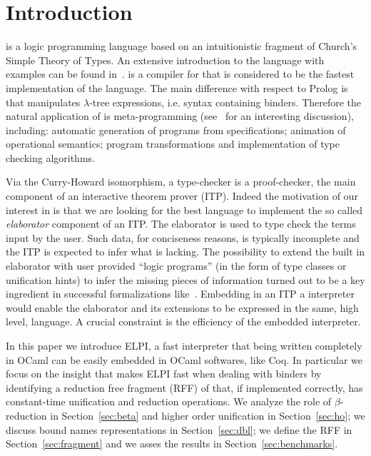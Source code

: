 \documentclass{llncs}
\begin{document}
\section{Introduction}%
\lp{} is a logic programming language based on an intuitionistic fragment of
Church's Simple Theory of Types. An extensive introduction to the language
with examples can be found in~\cite{Miller:2012:PHL:2331097}. \tedius{}
\cite{DBLP:conf/cade/NadathurM99,DBLP:journals/corr/abs-0911-5203} is a
compiler for \lp{} %
that is considered to be the fastest
implementation of the language. 
The main difference with respect to Prolog is that \lp{} manipulates
$\lambda$-tree expressions, i.e. syntax containing binders. Therefore the
natural application of \lp{} is meta-programming (see~\cite{LPAZ} for
an interesting discussion), including: automatic generation of programs from
specifications; animation of operational semantics;
program transformations and implementation of type checking algorithms.

Via the Curry-Howard isomorphism, a type-checker is a proof-checker, the main
component of an interactive theorem prover (ITP). Indeed the motivation of our
interest in \lp{} is that we are looking for the best 
language to implement the so called \emph{elaborator} component of an ITP.
The elaborator is used to type check the terms input by
the user.  Such data, for conciseness reasons, is typically incomplete and
the ITP is expected to infer what is lacking.  The possibility to
extend the built in elaborator with user provided ``logic programs'' (in the
form of type classes or unification hints) to infer the missing pieces of
information turned out to be a key ingredient in successful formalizations
like~\cite{gonthier:hal-00816699}.  Embedding in an ITP a \lp{} interpreter
would enable the elaborator and its extensions to be expressed in the same,
high level, language.  A crucial constraint is the efficiency of the embedded
\lp{} interpreter.

In this paper we introduce ELPI, a fast \lp{} interpreter that being written
completely in OCaml can be easily embedded in OCaml softwares, like Coq.
In particular we focus on the insight that makes ELPI fast when dealing with
binders by identifying a reduction free fragment (RFF) of \lp{} that, if
implemented correctly, has constant-time unification and reduction operations.
We analyze the role  of $\beta$-reduction in Section~\ref{sec:beta} and
higher order unification in Section~\ref{sec:ho}; we discuss bound names
representations in Section~\ref{sec:dbl}; we define the RFF 
in Section~\ref{sec:fragment} and we asses the results in
Section~\ref{sec:benchmarks}.
\end{document}
